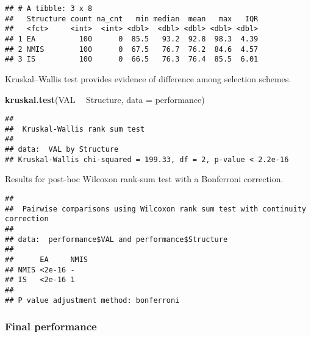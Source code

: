 \documentclass[]{book}
\newenvironment{Shaded}{\begin{snugshade}}{\end{snugshade}}
\newcommand{\DataTypeTok}[1]{\textcolor[rgb]{0.13,0.29,0.53}{#1}}
\newcommand{\KeywordTok}[1]{\textcolor[rgb]{0.13,0.29,0.53}{\textbf{#1}}}
\newcommand{\NormalTok}[1]{#1}
\newcommand{\OperatorTok}[1]{\textcolor[rgb]{0.81,0.36,0.00}{\textbf{#1}}}
\newcommand{\OtherTok}[1]{\textcolor[rgb]{0.56,0.35,0.01}{#1}}
\newcommand{\StringTok}[1]{\textcolor[rgb]{0.31,0.60,0.02}{#1}}
\begin{document}
\begin{verbatim}
## # A tibble: 3 x 8
##   Structure count na_cnt   min median  mean   max   IQR
##   <fct>     <int>  <int> <dbl>  <dbl> <dbl> <dbl> <dbl>
## 1 EA          100      0  85.5   93.2  92.8  98.3  4.39
## 2 NMIS        100      0  67.5   76.7  76.2  84.6  4.57
## 3 IS          100      0  66.5   76.3  76.4  85.5  6.01
\end{verbatim}

Kruskal--Wallis test provides evidence of difference among selection schemes.

\begin{Shaded}
\begin{Highlighting}[]
\KeywordTok{kruskal.test}\NormalTok{(VAL }\OperatorTok{~}\StringTok{ }\NormalTok{Structure, }\DataTypeTok{data =}\NormalTok{ performance)}
\end{Highlighting}
\end{Shaded}

\begin{verbatim}
## 
##  Kruskal-Wallis rank sum test
## 
## data:  VAL by Structure
## Kruskal-Wallis chi-squared = 199.33, df = 2, p-value < 2.2e-16
\end{verbatim}

Results for post-hoc Wilcoxon rank-sum test with a Bonferroni correction.

\begin{Shaded}
\end{Shaded}

\begin{verbatim}
## 
##  Pairwise comparisons using Wilcoxon rank sum test with continuity correction 
## 
## data:  performance$VAL and performance$Structure 
## 
##      EA     NMIS
## NMIS <2e-16 -   
## IS   <2e-16 1   
## 
## P value adjustment method: bonferroni
\end{verbatim}

\hypertarget{final-performance-11}{%
\subsubsection{Final performance}\label{final-performance-11}}
\end{document}
